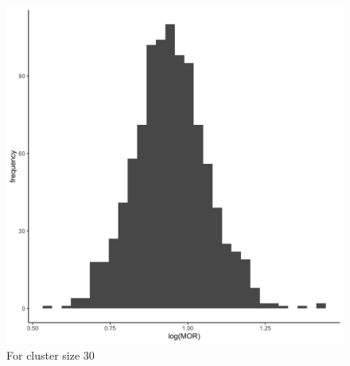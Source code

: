 \documentclass[
  letterpaper,
  DIV=11,
  numbers=noendperiod,
  titlepage]{scrartcl}
\begin{document}
\begin{figure}
\begin{minipage}[t]{0.50\linewidth}
{{\includegraphics{../../plots/two-lvl-ran-slope/high-prev/hist_100_30_two_lvl_slp_high_prev.png}

}

\caption{For cluster size 30}

}

\end{minipage}%
%
\begin{minipage}[t]{0.50\linewidth}

{\centering 

}
\end{minipage}
\end{figure}
\end{document}

